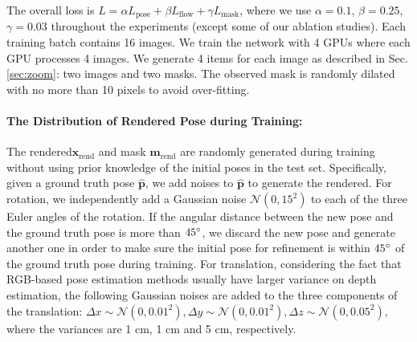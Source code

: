 \documentclass[twocolumn]{svjour3}
\newcommand{\xrend}[0]{\mathbf{x}_{\text{rend}}}
\newcommand{\mrend}[0]{\mathbf{m}_{\text{rend}}}
\newcommand{\rend}[0]{rendered}
\newcommand{\gtpose}[0]{\mathbf{\hat{p}}}
\begin{document}
The overall loss is $L = \alpha L_\text{pose} + \beta L_\text{flow} + \gamma L_\text{mask}$, where we use $\alpha = 0.1$, $\beta = 0.25$, $\gamma = 0.03$ throughout the experiments (except some of our ablation studies). Each training batch contains 16 images. We train the network with 4 GPUs where each GPU processes 4 images. We generate 4 items for each image as described in Sec. \ref{sec:zoom}: two images and two masks. The observed mask is randomly dilated with no more than 10 pixels to avoid over-fitting.

\paragraph{The Distribution of Rendered Pose during Training:}
The \rend\image $\xrend$ and mask $\mrend$ are randomly generated during training without using prior knowledge of the initial poses in the test set. 
Specifically, given a ground truth pose $\gtpose$, we add noises to $\gtpose$ to generate the \rend\poses. 
For rotation, we independently add a Gaussian noise $\mathcal{N}(0, 15^2)$ to each of the three Euler angles of the rotation. If the angular distance between the new pose and the ground truth pose is more than $45\degree$, we discard the new pose and generate another one in order to make sure the initial pose for refinement is within $45\degree$ of the ground truth pose during training. 
For translation, considering the fact that RGB-based pose estimation methods usually have larger variance on depth estimation, the following Gaussian noises are added to the three components of the translation: $\Delta x \sim \mathcal{N}(0, 0.01^2), \Delta y \sim \mathcal{N}(0, 0.01^2), \Delta z \sim \mathcal{N}(0, 0.05^2)$, where the variances are 1 cm, 1 cm and 5 cm, respectively.



\begin{figure*}[t]
\hfill
{}
\hfill
{}
\caption{Synthetic Data for the LINEMOD, Occlusion dataset and YCB-Video separately. \ref{subig.data_syn_lm} shows the synthetic training data used when training on the LINEMOD dataset, only one object is presented in the image so there is no occlusion. \ref{subfig.data_syn_occ} shows the synthetic training data used when training on the Occlusion dataset, multiple objects are presented in one image so one object may be occluded by other objects. \ref{subfig.data_syn_ycb} shows the synthetic training data used when training on the YCB-Video dataset. These images are rendered on the fly, so we only render two objects to maintain efficiency.}
\label{fig.data_syn}
\vspace{-4mm}
\end{figure*}
\end{document}
